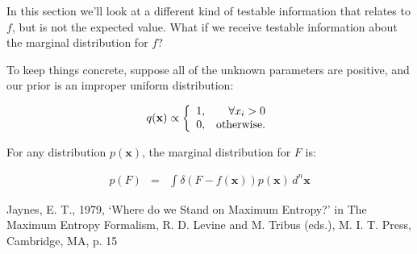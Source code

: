 \documentclass[letterpaper, 11pt]{article}
\begin{document}
In this section we'll look at a different kind of testable information that
relates to $f$, but is not the expected value. What if we receive testable
information about the marginal distribution for $f$?

To keep things concrete, suppose all of the unknown parameters are positive,
and our prior is an improper uniform distribution:

\begin{eqnarray}
q(\mathbf{x}) \propto
\left\{
\begin{array}{lr}
1, & \forall x_i > 0\\
0, & \textnormal{otherwise}.
\end{array}
\right.
\end{eqnarray}

For any distribution $p(\mathbf{x})$, the marginal distribution for $F$ is:

\begin{eqnarray}
p(F) &=& \int \delta\left(F - f(\mathbf{x})\right)p(\mathbf{x}) \, d^n \mathbf{x}
\end{eqnarray}

\begin{thebibliography}{}
Jaynes, E. T., 1979, `Where do we Stand on Maximum Entropy?' in The Maximum Entropy Formalism, R. D. Levine and M. Tribus (eds.), M. I. T. Press, Cambridge, MA, p. 15
\end{thebibliography}
\end{document}
